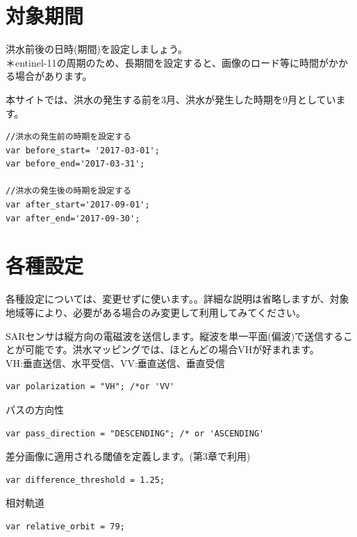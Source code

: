 \documentclass[
]{book}
\begin{document}
\hypertarget{ux5bfeux8c61ux671fux9593}{%
\section{対象期間}\label{ux5bfeux8c61ux671fux9593}}

洪水前後の日時(期間)を設定しましょう。\\
＊entinel-11の周期のため、長期間を設定すると、画像のロード等に時間がかかる場合があります。

本サイトでは、洪水の発生する前を3月、洪水が発生した時期を9月としています。

\begin{verbatim}
//洪水の発生前の時期を設定する
var before_start= '2017-03-01';
var before_end='2017-03-31';

//洪水の発生後の時期を設定する
var after_start='2017-09-01';
var after_end='2017-09-30';
\end{verbatim}

\hypertarget{ux5404ux7a2eux8a2dux5b9a}{%
\section{各種設定　　}\label{ux5404ux7a2eux8a2dux5b9a}}

各種設定については、変更せずに使います。。詳細な説明は省略しますが、対象地域等により、必要がある場合のみ変更して利用してみてください。

SARセンサは縦方向の電磁波を送信します。縦波を単一平面(偏波)で送信することが可能です。洪水マッピングでは、ほとんどの場合VHが好まれます。\\
VH:垂直送信、水平受信、VV:垂直送信、垂直受信

\begin{verbatim}
var polarization = "VH"; /*or 'VV' 
\end{verbatim}

パスの方向性

\begin{verbatim}
var pass_direction = "DESCENDING"; /* or 'ASCENDING'
\end{verbatim}

差分画像に適用される閾値を定義します。(第3章で利用)

\begin{verbatim}
var difference_threshold = 1.25;
\end{verbatim}

相対軌道

\begin{verbatim}
var relative_orbit = 79; 
\end{verbatim}
\end{document}
